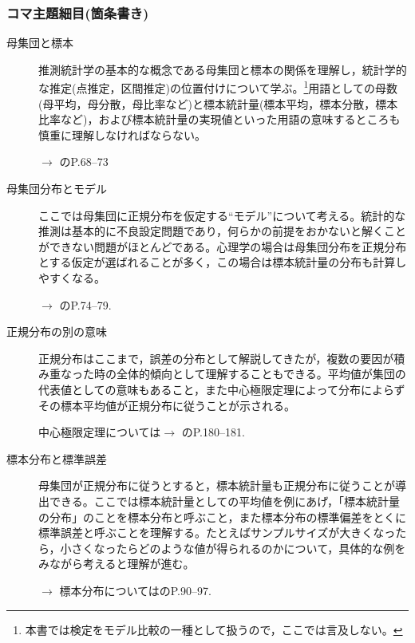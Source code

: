 \subsubsection{コマ主題細目(箇条書き)}
\begin{description}
	\item[母集団と標本]推測統計学の基本的な概念である母集団と標本の関係を理解し，統計学的な推定(点推定，区間推定)の位置付けについて学ぶ。\footnote{本書では検定をモデル比較の一種として扱うので，ここでは言及しない。}用語としての母数(母平均，母分散，母比率など)と標本統計量(標本平均，標本分散，標本比率など)，および標本統計量の実現値といった用語の意味するところも慎重に理解しなければならない。
	      \begin{flushright}
		      $\to$ \textcite{Yamada2004}のP.68--73
	      \end{flushright}

	\item[母集団分布とモデル]ここでは母集団に正規分布を仮定する``モデル''について考える。統計的な推測は基本的に不良設定問題であり，何らかの前提をおかないと解くことができない問題がほとんどである。心理学の場合は母集団分布を正規分布とする仮定が選ばれることが多く，この場合は標本統計量の分布も計算しやすくなる。
	      \begin{flushright}
		      $\to$ \textcite{Yamada2004}のP.74--79.
	      \end{flushright}

	\item[正規分布の別の意味]正規分布はここまで，誤差の分布として解説してきたが，複数の要因が積み重なった時の全体的傾向として理解することもできる。平均値が集団の代表値としての意味もあること，また中心極限定理によって分布によらずその標本平均値が正規分布に従うことが示される。
	      \begin{flushright}
		      中心極限定理については$\to$ \textcite{Minamoto2015}のP.180--181.
	      \end{flushright}

	\item[標本分布と標準誤差]母集団が正規分布に従うとすると，標本統計量も正規分布に従うことが導出できる。ここでは標本統計量としての平均値を例にあげ，「標本統計量の分布」のことを標本分布と呼ぶこと，また標本分布の標準偏差をとくに標準誤差と呼ぶことを理解する。たとえばサンプルサイズが大きくなったら，小さくなったらどのような値が得られるのかについて，具体的な例をみながら考えると理解が進む。
	      \begin{flushright}
		      $\to$ 標本分布については\textcite{Yamada2004}のP.90--97.
	      \end{flushright}

\end{description}
